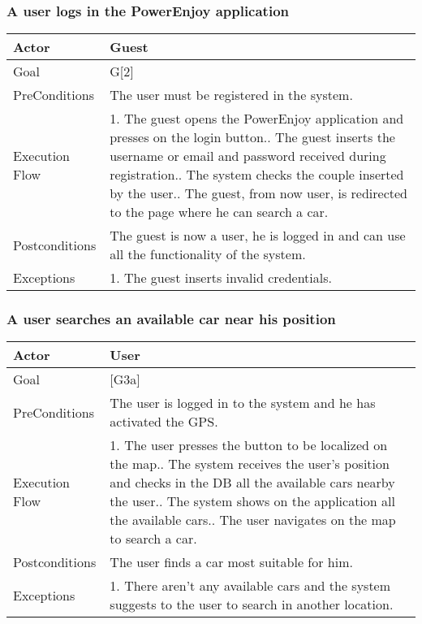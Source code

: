 \documentclass[english]{article}
\begin{document}
	\subsubsection{A user logs in the PowerEnjoy application} 	\begin{tabularx}{\textwidth}{  l  X  } 		\hline 		Actor & Guest\\ 		\hline 		Goal & G[2]\\ 		\hline 		PreConditions & The user must be registered in the system.\\ 		\hline 		Execution Flow & 1. The guest opens the PowerEnjoy application and presses on the login button.\newline 										 2. The guest inserts the username or email and password received during registration.\newline 										 3. The system checks the couple inserted by the user.\newline 										 4. The guest, from now user, is redirected to the page where he can search a car.\\ 		\hline 		Postconditions & The guest is now a user, he is logged in and can use all the functionality of the system.\\ 		\hline 		Exceptions & 1. The guest inserts invalid credentials.\\ 		\hline 	\end{tabularx}
	\subsubsection{A user searches an available car near his position} 	\begin{tabularx}{\textwidth}{  l  X  } 		\hline 		Actor & User\\ 		\hline 		Goal & [G3a]\\ 		\hline 		PreConditions & The user is logged in to the system and he has activated the GPS.\\ 		\hline 		Execution Flow & 1. The user presses the button to be localized on the map.\newline 										 2. The system receives the user's position and checks in the DB all the available cars nearby the user.\newline 										 3. The system shows on the application all the available cars.\newline 										 4. The user navigates on the map to search a car.\\ 		\hline 		Postconditions & The user finds a car most suitable for him.\\ 		\hline 		Exceptions & 1. There aren't any available cars and the system suggests to the user to search in another location.\\ 		\hline 	\end{tabularx}
\end{document}
